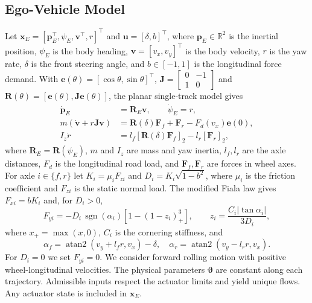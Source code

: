 \documentclass[journal]{IEEEtran}
\theoremstyle{definition}
\newcommand{\vct}[1]{\boldsymbol{#1}}
\newcommand{\mtx}[1]{\mathbf{#1}}
\begin{document}
\subsection{Ego-Vehicle Model}
Let $\vct x_E=[\vct p_E^\top,\psi_E,\vct v^\top,r]^\top$ and
$\vct u=[\delta,b]^\top$, where $\vct p_E\in\mathbb R^2$ is the inertial
position, $\psi_E$ is the body heading, $\vct v=[v_x,v_y]^\top$ is the
body velocity, $r$ is the yaw rate, $\delta$ is the front steering angle,
and $b\in[-1,1]$ is the longitudinal force demand. With
$\vct e(\theta)=[\cos\theta,\sin\theta]^\top$,
$\mtx J=\left[\begin{smallmatrix}0&-1\\1&0\end{smallmatrix}\right]$ and
$\mtx R(\theta)=[\vct e(\theta),\mtx J\vct e(\theta)]$, the planar
single-track model gives
\begin{equation}\label{eq:ego}
\begin{aligned}
 \dot{\vct p}_E&=\mtx R_E\vct v,\qquad \dot\psi_E=r,\\
 m(\dot{\vct v}+r\mtx J\vct v)
   &=\mtx R(\delta)\vct F_f+\vct F_r-F_d(v_x)\vct e(0),\\
 I_z\dot r&=l_f[\mtx R(\delta)\vct F_f]_2-l_r[\vct F_r]_2 ,
\end{aligned}
\end{equation}
where $\mtx R_E=\mtx R(\psi_E)$, $m$ and $I_z$ are mass and yaw
inertia, $l_f,l_r$ are the axle distances, $F_d$ is the longitudinal
road load, and $\vct F_f,\vct F_r$ are forces in wheel axes. For axle
$i\in\{f,r\}$ let $K_i=\mu_i F_{zi}$ and $D_i=K_i\sqrt{1-b^2}$, where
$\mu_i$ is the friction coefficient and $F_{zi}$ is the static normal
load. The modified Fiala law gives $F_{xi}=bK_i$ and, for $D_i>0$,
\begin{equation*}
 F_{yi}=-D_i\,\operatorname{sgn}(\alpha_i)
       [1-(1-z_i)_+^3],\qquad z_i=\frac{C_i|\tan\alpha_i|}{3D_i},
\end{equation*}
where $x_+=\max(x,0)$, $C_i$ is the cornering stiffness, and
\begin{equation*}
 \alpha_f=\operatorname{atan2}(v_y+l_fr,v_x)-\delta,\quad
 \alpha_r=\operatorname{atan2}(v_y-l_rr,v_x).
\end{equation*}
For $D_i=0$ we set $F_{yi}=0$. We consider forward rolling motion with
positive wheel-longitudinal velocities. The physical parameters
$\vct\vartheta$ are constant along each trajectory. Admissible inputs
respect the actuator limits and yield unique flows. Any actuator state
is included in $\vct x_E$.
\end{document}

